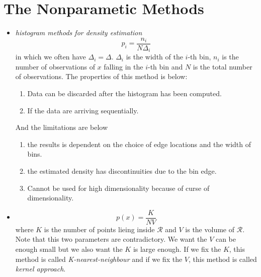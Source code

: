 \documentclass[12pt, a4paper]{article}
\begin{document}
    \section{The Nonparametic Methods}
    \begin{itemize}
        \item \textit{histogram methods for density estimation}
        \begin{equation}
            p_i=\frac{n_i}{N\Delta_i}
        \end{equation}
        in which we often have $\Delta_i=\Delta$. $\Delta_i$ is the width of the $i$-th bin, $n_i$ is 
        the number of observations of $x$ falling in the $i$-th bin and $N$ is the total number of 
        observations. The properties of this method is below:
        \begin{enumerate}
            \item Data can be discarded after the histogram has been computed.
            \item If the data are arriving sequentially.
        \end{enumerate}
        And the limitations are below
        \begin{enumerate}
            \item the results is dependent on the choice of edge locations and the width of bins.
            \item the estimated density has discontinuities due to the bin edge.
            \item Cannot be used for high dimensionality because of curse of dimensionality.
        \end{enumerate}
        \item \begin{equation}
            p(x)=\frac{K}{NV}
        \end{equation}
        where $K$ is the number of points lieing inside $\mathcal{R}$ and $V$ is the volume of 
        $\mathcal{R}$. Note that this two parameters are contradictory. We want the $V$ can be 
        enough small but we also want the $K$ is large enough. If we fix the $K$, this method is 
        called \textit{K-nearest-neighbour} and if we fix the $V$, this method is called 
        \textit{kernel approach}.
    \end{itemize}
\end{document}

